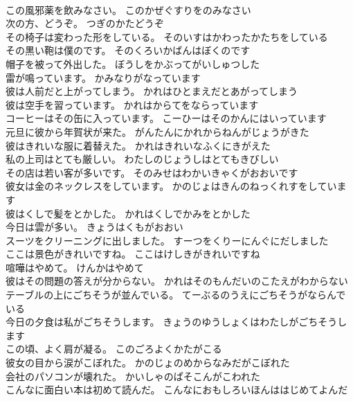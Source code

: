 \documentclass[8pt]{extreport}
\begin{document}
\begin{CJK}{UTF8}{min}
\\	この風邪薬を飲みなさい。	このかぜぐすりをのみなさい 
\\	次の方、どうぞ。	つぎのかたどうぞ 
\\	その椅子は変わった形をしている。	そのいすはかわったかたちをしている 
\\	その黒い鞄は僕のです。	そのくろいかばんはぼくのです 
\\	帽子を被って外出した。	ぼうしをかぶってがいしゅつした 
\\	雷が鳴っています。	かみなりがなっています 
\\	彼は人前だと上がってしまう。	かれはひとまえだとあがってしまう 
\\	彼は空手を習っています。	かれはからてをならっています 
\\	コーヒーはその缶に入っています。	こーひーはそのかんにはいっています 
\\	元旦に彼から年賀状が来た。	がんたんにかれからねんがじょうがきた 
\\	彼はきれいな服に着替えた。	かれはきれいなふくにきがえた 
\\	私の上司はとても厳しい。	わたしのじょうしはとてもきびしい 
\\	その店は若い客が多いです。	そのみせはわかいきゃくがおおいです 
\\	彼女は金のネックレスをしています。	かのじょはきんのねっくれすをしています 
\\	彼はくしで髪をとかした。	かれはくしでかみをとかした 
\\	今日は雲が多い。	きょうはくもがおおい 
\\	スーツをクリーニングに出しました。	すーつをくりーにんぐにだしました 
\\	ここは景色がきれいですね。	ここはけしきがきれいですね 
\\	喧嘩はやめて。	けんかはやめて 
\\	彼はその問題の答えが分からない。	かれはそのもんだいのこたえがわからない 
\\	テーブルの上にごちそうが並んでいる。	てーぶるのうえにごちそうがならんでいる 
\\	今日の夕食は私がごちそうします。	きょうのゆうしょくはわたしがごちそうします 
\\	この頃、よく肩が凝る。	このごろよくかたがこる 
\\	彼女の目から涙がこぼれた。	かのじょのめからなみだがこぼれた 
\\	会社のパソコンが壊れた。	かいしゃのぱそこんがこわれた 
\\	こんなに面白い本は初めて読んだ。	こんなにおもしろいほんははじめてよんだ 

\end{CJK}
\end{document}
